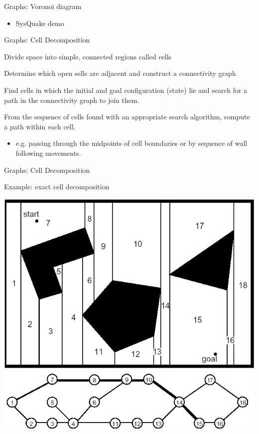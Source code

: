 \documentclass[compress]{beamer}
\begin{document}
\begin{frame}{Graphs: Voronoi diagram}

\begin{itemize}
\item SysQuake demo
\end{itemize}

\end{frame}

\begin{frame}{Graphs: Cell Decomposition}

Divide space into simple, connected regions called cells

Determine which open sells are adjacent and construct a connectivity
graph

Find cells in which the initial and goal configuration (state) lie and
search for a path in the connectivity graph to join them.

From the sequence of cells found with an appropriate search algorithm,
compute a path within each cell.

\begin{itemize}
\item e.g. passing through the midpoints of cell boundaries or by sequence
  of wall following movements.
\end{itemize}

\end{frame}

\begin{frame}{Graphs: Cell Decomposition}

Example: exact cell decomposition

    \begin{center}
        \includegraphics[width=0.8\linewidth]{exactcelldecomposition}
    \end{center}

\end{frame}
\end{document}
